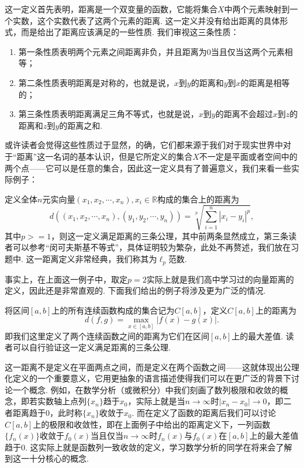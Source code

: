 这一定义首先表明，距离是一个双变量的函数，它能将集合$X$中两个元素映射到一个实数，这个实数代表了这两个元素的距离. 这一定义并没有给出距离的具体形式，而是给出了距离应该满足的一些性质. 我们审视这三条性质：
\begin{enumerate}
    \item 第一条性质表明两个元素之间距离非负，并且距离为0当且仅当这两个元素相等；
    \item 第二条性质表明距离是对称的，也就是说，$x$到$y$的距离和$y$到$x$的距离是相等的；
    \item 第三条性质表明距离满足三角不等式，也就是说，$x$到$y$的距离不会超过$x$到$z$的距离和$z$到$y$的距离之和.
\end{enumerate}

或许读者会觉得这些性质过于显然，的确，它们都来源于我们对于现实世界中对于``距离''这一名词的基本认识，但是它所定义的集合$X$不一定是平面或者空间中的两个点——它可以是任意的集合，因此这一定义具有了普遍意义，我们来看一些实际例子：

\begin{example*}
    定义全体$n$元实向量$(x_1,x_2,\cdots,x_n),x_i\in \mathbb{R}$构成的集合上的距离为
    \[d((x_1,x_2,\cdots,x_n),(y_1,y_2,\cdots,y_n))=\sqrt[p]{\sum_{i=1}^n|x_i-y_i|^p},\]
    其中$p>=1$，则这一定义满足距离的三条公理，其中前两条显然成立，第三条读者可以参考``闵可夫斯基不等式''，具体证明较为繁杂，此处不再赘述，我们放在习题中. 这一距离定义非常经典，我们称其为$\ell_p$范数.
\end{example*}

事实上，在上面这一例子中，取定$p=2$实际上就是我们高中学习过的向量距离的定义，因此还是非常直观的. 下面我们给出的例子将涉及更为广泛的情况.

\begin{example*}
    将区间$[a,b]$上的所有连续函数构成的集合记为$C[a,b]$，定义$C[a,b]$上的距离为
    \[d(f,g)=\max_{x\in [a,b]}|f(x)-g(x)|.\]
    即我们这里定义了两个连续函数之间的距离为它们在区间$[a,b]$上的最大差值. 读者可以自行验证这一定义满足距离的三条公理.
\end{example*}

这一距离不是定义在平面两点之间，而是定义在两个函数之间——这就体现出公理化定义的一个重要意义，它用更抽象的语言描述使得我们可以在更广泛的背景下讨论一个概念. 例如，在数学分析（或微积分）中我们刻画了数列极限和收敛的概念，即若实数轴上点列$\{x_n\}$趋于$x_0$，实际上就是当$n\to\infty$时$|x_n-x_0|\to 0$，即二者距离趋于0，此时称$\{x_n\}$收敛于$x_0$. 而在定义了函数的距离后我们可以讨论$C[a,b]$上的极限和收敛性，即在上面例子中给出的距离定义下，一列函数$\{f_n(x)\}$收敛于$f_0(x)$当且仅当$n\to\infty$时$f_n(x)$与$f_0(x)$在$[a,b]$上的最大差值趋于0. 这实际上就是函数列一致收敛的定义，学习数学分析的同学在将来会了解到这一十分核心的概念.

